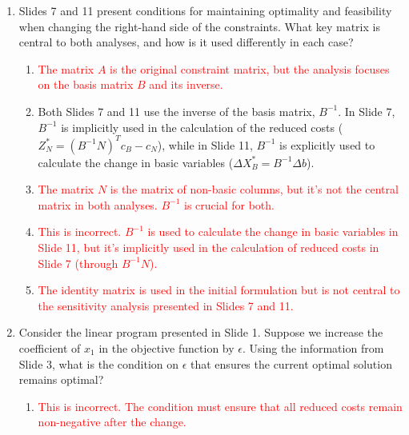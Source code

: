 \documentclass{article}%
\newcommand{\incorrect}[1]{\textcolor{red}{#1}}
\begin{document}
\begin{enumerate}
\begin{enumerate}
\item \incorrect{The primal simplex method is not directly used for sensitivity analysis in this context; the analysis is performed using the information from the final simplex tableau.}%
\item \incorrect{Linear programming duality is a related concept, but the approach described in the slides is based on analyzing the reduced costs directly from the final simplex tableau.}%
\end{enumerate}%
\vspace{1em}%
\item Slides 7 and 11 present conditions for maintaining optimality and feasibility when changing the right-hand side of the constraints. What key matrix is central to both analyses, and how is it used differently in each case?%
\begin{enumerate}%
\item \incorrect{The matrix $A$ is the original constraint matrix, but the analysis focuses on the basis matrix $B$ and its inverse.}%
\item Both Slides 7 and 11 use the inverse of the basis matrix, $B^{-1}$. In Slide 7, $B^{-1}$ is implicitly used in the calculation of the reduced costs ($Z_N^* = (B^{-1}N)^T c_B - c_N$), while in Slide 11, $B^{-1}$ is explicitly used to calculate the change in basic variables ($\Delta X_B^* = B^{-1}\Delta b$).%
\item \incorrect{The matrix $N$ is the matrix of non-basic columns, but it's not the central matrix in both analyses.  $B^{-1}$ is crucial for both.}%
\item \incorrect{This is incorrect.  $B^{-1}$ is used to calculate the change in basic variables in Slide 11, but it's implicitly used in the calculation of reduced costs in Slide 7 (through $B^{-1}N$).}%
\item \incorrect{The identity matrix is used in the initial formulation but is not central to the sensitivity analysis presented in Slides 7 and 11.}%
\end{enumerate}%
\vspace{1em}%
\item Consider the linear program presented in Slide 1. Suppose we increase the coefficient of $x_1$ in the objective function by $\epsilon$. Using the information from Slide 3, what is the condition on $\epsilon$ that ensures the current optimal solution remains optimal?%
\begin{enumerate}%
\item \incorrect{This is incorrect.  The condition must ensure that all reduced costs remain non-negative after the change.}%

\end{enumerate}
\end{enumerate}
\end{document}
